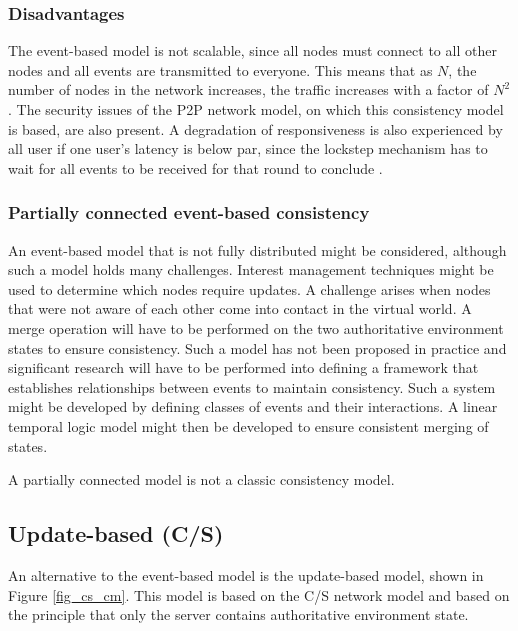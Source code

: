 \subsubsection{Disadvantages}
The event-based model is not scalable, since all nodes must connect to all other nodes and all events are transmitted to
everyone. This means that as $N$, the number of nodes in the network increases, the traffic increases with a factor of $N^2$. The security issues of
the P2P network model, on which this consistency model is based, are also present. A degradation of responsiveness is also experienced by all user if one user's
latency is below par, since the lockstep mechanism has to wait for all events to be received for that round to conclude \cite{cheat_proof_event_ordering}.

\subsubsection{Partially connected event-based consistency}
An event-based model that is not fully distributed might be considered, although such a model holds many challenges. Interest management techniques might be used to determine which nodes require updates. A challenge arises when nodes that were not aware of each other come into contact in the virtual world. A merge operation will have to be performed on the two authoritative environment states to ensure consistency. Such a model has not been proposed in practice and significant research will have to be performed into defining a framework that establishes relationships between events to maintain consistency. Such a system might be developed by defining classes of events and their interactions. A linear temporal logic model might then be developed to ensure consistent merging of states.

A partially connected model is not a classic consistency model.

\subsection{Update-based (C/S)}
\label{classic_update_based}

An alternative to the event-based model is the update-based model, shown in Figure \ref{fig_cs_cm}. This model is based on the C/S network model and based on the principle that only the server contains authoritative environment state.

